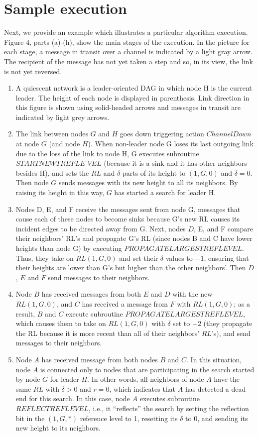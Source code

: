 \section{Sample execution}
Next, we provide an example which illustrates a particular algorithm execution. Figure 4, parts (a)-(h), show the main stages of the execution. In the picture for each stage, a message in transit over a channel is indicated by a light gray arrow. The recipient of the message has not yet taken a step and so, in its view, the link is not yet reversed.
\begin{enumerate}[label=\alph*)]
	\item A quiescent network is a leader-oriented DAG in which node H is the current leader. The height of each node is displayed in parenthesis. Link direction in this figure is shown using solid-headed arrows and messages in transit are indicated by light grey arrows.
	\item The link between nodes $G$ and $H$ goes down triggering action $ChannelDown$ at node $G$ (and node $H$). When non-leader node G loses its last outgoing link due to the loss of the link to node H, G executes subroutine $STARTNEWTREFLE$-$VEL$ (because it is a sink and it has other neighbors besides H), and sets the $RL$ and $\delta$ parts of its height to $(1,G,0)$ and $\delta = 0$. Then node $G$ sends messages with its new height to all its neighbors. By raising its height in this way, $G$ has started a search for leader H.
	\item Nodes D, E, and F receive the messages sent from node G, messages that cause each of these nodes to become sinks because G’s new RL causes its incident edges to be directed away from G. Next, nodes $D$, E, and F compare their neighbors’ RL’s and propagate G’s RL (since nodes B and C have lower heights than node G) by executing $PROPAGATELARGESTREFLEVEL$. Thus, they take on $RL (1,G,0)$ and set their $\delta$ values to $-1$, ensuring that their heights are lower than G’s but higher than the other neighbors’. Then $D$, $E$ and $F$ send messages to their neighbors.
	\item Node $B$ has received messages from both $E$ and $D$ with the new $RL (1,G,0)$, and $C$ has received a message from $F$ with $RL (1,G,0)$; as a result, $B$ and $C$ execute subroutine $PROPAGATELARGESTREFLEVEL$, which causes them to take on $RL (1,G,0)$ with $\delta$ set to $-2$ (they propagate the RL because it is more recent than all of their neighbors’ $RL$’s), and send messages to their neighbors.
	\item Node $A$ has received message from both nodes $B$ and $C$. In this situation, node $A$ is connected only to nodes that are participating in the search started by node $G$ for leader $H$. In other words, all neighbors of node $A$ have the same $RL$ with $\delta > 0$ and $r = 0$, which indicates that $A$ has detected a dead end for this search. In this case, node $A$ executes subroutine $REFLECTREFLEVEL$, i.e., it “reflects” the search by setting the reflection bit in the $(1,G,*)$ reference level to 1, resetting its $\delta$ to 0, and sending its new height to its neighbors.

\end{enumerate}
